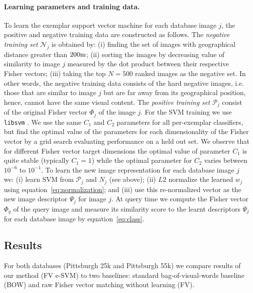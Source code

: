 \documentclass[10pt,twocolumn,letterpaper]{article}
\begin{document}
      \paragraph{Learning parameters and training data.}
         To learn the exemplar support vector machine for each database image $j$, the positive and negative training data are constructed as follows. The \emph{negative training set} $\mathcal N_j$ is obtained by: (i) finding the set of images with geographical distance greater than $200{\rm m}$; (ii)  sorting the images by decreasing value of similarity to image $j$ measured by the dot product between their respective Fisher vectors; (iii) taking the top $N=500$ ranked images as the negative set. In other words, the negative training data consists of the hard negative images, i.e. those that are similar to image $j$ but are far away from its geographical position, hence, cannot have the same visual content. The \emph{positive training set} $\mathcal P_j$
         consist of the original Fisher vector $\Phi_j$ of the image $j$.
         For the SVM training we use {\tt libsvm} \cite{libsvm}.
         We use the same $C_1$ and $C_2$ parameters for all per-exemplar classifiers, but find the optimal value of the parameters for each dimensionality of the Fisher vector by a grid search evaluating performance on a held out set.
         We observe that for different Fisher vector target dimensions the optimal value of parameter $C_1$ is quite stable (typically $C_1=1$) while the optimal parameter for $C_2$ varies between $10^{-6}$ to $10^{-1}$.
         To learn the new image representation for each database image $j$ we: (i) learn SVM from $\mathcal P_j$ and $N_j$ (see above); (ii) $L2$ normalize the learned $w_j$ using equation~\eqref{eq:normalization}; and (iii) use this re-normalized vector as the new image descriptor $\Psi_j$ for image $j$. At query time we compute the Fisher vector $\Phi_q$ of the query image and measure its similarity score to the learnt descriptors $\Psi_j$ for each database image by equation~\eqref{eq:class}.
   

   \subsection{Results}  
      For both databases (Pittsburgh 25k and Pittsburgh 55k) we compare results of our method (FV e-SVM) to two baselines: standard bag-of-visual-words baseline (BOW) and raw Fisher vector matching without learning (FV).  
\end{document}
